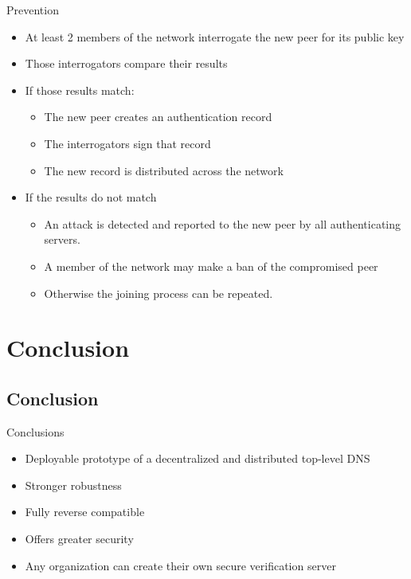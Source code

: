 \documentclass[11pt]{beamer}
\begin{document}
\begin{frame}{Prevention}
	
	\begin{itemize}
		\item  At least 2 members of the network interrogate the new peer for its public key
		\item  Those interrogators compare their results
		\item  If those results match:
		\begin{itemize}
			
			\item The new peer creates an authentication record
			\item The interrogators sign that record
			\item The new record is distributed across the network
		\end{itemize}
		
		
		\item  If the results do not match
		\begin{itemize}
			
			\item An attack is detected and reported to the new peer by all authenticating servers.
			\item A member of the network may make a ban of the compromised peer
			\item Otherwise the joining process can be repeated.
		\end{itemize}
		
	\end{itemize}
	
	
\end{frame}



\section{Conclusion}



\subsection{Conclusion}
\begin{frame}{Conclusions}
	\begin{itemize}
		\item Deployable prototype of a decentralized and distributed top-level DNS
		\item Stronger robustness
		\item Fully reverse compatible
		\item Offers greater security
		\item Any organization can create their own secure verification server
		
	\end{itemize}
\end{frame}
\end{document}
